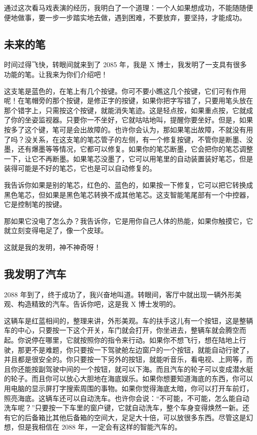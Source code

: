 \documentclass[UTF8,a4paper,titlepage,twoside,10.5pt]{article}
\begin{document}
通过这次看马戏表演的经历，我明白了一个道理：一个人如果想成功，不能随随便便地做事，要一步一步踏实地去做，遇到困难，不要放弃，要坚持，才能成功。

\subsection{未来的笔}
\label{sec:orga894b73}

时间过得飞快，转眼间就来到了 2085 年，我是 X 博士，我发明了一支具有很多功能的笔。让我来为你们介绍吧！

这支笔是蓝色的，在笔上有几个按键。你可不要小瞧这几个按键，它们可有作用呢！在笔帽旁的那个按键，是修正字的按键，如果你把字写错了，只要用笔头放在那个错字上，只需按这个按键，就能消失笔迹。这是轻点按，如果重点按，它就成了你的坐姿监视器。只要你一不坐好，它就咕咕地叫，提醒你要坐好。但是，如果按多了这个键，笔可是会出故障的。也许你会认为，那如果笔出故障，不就没有用了吗？没关系，在这支笔的笔芯管子的左侧，有一个修复按键，不管你是断墨、没墨，还有爆墨等等情况，它都可以修复。如果你的笔芯断墨，它会把你的笔芯调整一下，让它不再断墨。如果笔芯没墨了，它可以用笔里的自动装置装好笔芯，但是装得可能是不好的笔芯，它也是可以自动修复的。

我告诉你如果是别的笔芯，红色的、蓝色的，如果按一下修复，它可以把它转换成黑色笔芯，但如果是黑色笔芯转换不成其他笔芯。这支智能笔尾部有一个中控器，它是控制笔的按键。

那如果它没电了怎么办？我告诉你，它是用你自己人体的热能，如果你触摸它，它就立刻变得电足了，像一个皮球。

这就是我的发明，神不神奇呀！

\subsection{我发明了汽车}
\label{sec:org63c6c10}

2088 年到了，终于成功了，我兴奋地叫道。转眼间，客厅中就出现一辆外形美观、构造精致的汽车。告诉你吧，这是我 X 博士发明的。

这辆车是红蓝相间的，整理来讲，外形美观。车的扶手这儿有一个按钮，这是整辆车的中心，只要按一下这个开关，车门就会打开，你坐进去，整辆车就会腾空而起。你说停在哪里，它就按照你的指令来行动。如果你不想飞行，想在陆地上行驶，那更不是难题，你只要按一下驾驶舱左边窗户的一个按钮，就能自动行驶了，并且都是很安全的。你只要按一下另外的按钮，就能听音乐，看电视、上网等，而且你还能按副驾驶中间的一个按钮，就可以下海。而且汽车的轮子可以变成潜水艇的轮子。而且你可以放心大胆地在海底娱乐。如果你想要知道海底的东西，你可以用电脑的显示屏打字搜索周围的事物。如果你觉得海底太暗，你可以打开车前灯，照亮海底。这辆车还可以自动洗车。也许你会说：“不可能，不可能，怎么能自动洗车呢？”只要按一下车里的窗户键，它就自动洗车，整个车身变得焕然一新。还有它的后备箱比其他后备箱的空间大，足足大十倍，可以放很多东西。尽管这是幻想，但是我相信在 2088 年，一定会有这样的智能汽车的。
\end{document}
